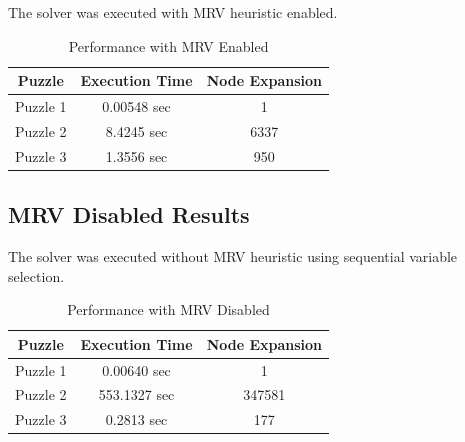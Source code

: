 \documentclass[12pt,a4paper]{article}
\begin{document}
The solver was executed with MRV heuristic enabled.


\begin{table}[H]

\centering

\begin{tabular}{ccc}

\toprule

Puzzle & Execution Time & Node Expansion \\

\midrule

Puzzle 1 & 0.00548 sec & 1 \\

Puzzle 2 & 8.4245 sec & 6337 \\

Puzzle 3 & 1.3556 sec & 950 \\

\bottomrule

\end{tabular}


\caption{Performance with MRV Enabled}

\end{table}






\subsection{MRV Disabled Results}


The solver was executed without MRV heuristic using sequential variable
selection.


\begin{table}[H]

\centering

\begin{tabular}{ccc}

\toprule

Puzzle & Execution Time & Node Expansion \\

\midrule

Puzzle 1 & 0.00640 sec & 1 \\

Puzzle 2 & 553.1327 sec & 347581 \\

Puzzle 3 & 0.2813 sec & 177 \\


\bottomrule

\end{tabular}


\caption{Performance with MRV Disabled}

\end{table}
\end{document}
